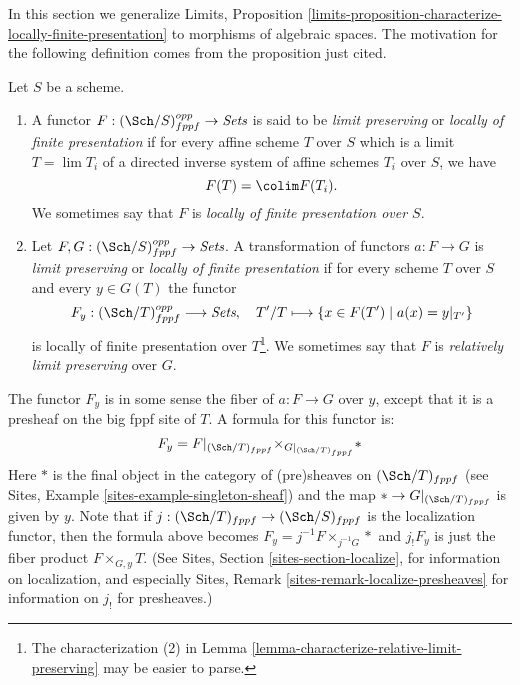 \noindent
In this section we generalize
Limits, Proposition
\ref{limits-proposition-characterize-locally-finite-presentation}
to morphisms of algebraic spaces.
The motivation for the following definition comes from
the proposition just cited.

\begin{definition}
\label{definition-locally-finite-presentation}
Let $S$ be a scheme.
\begin{enumerate}
\item A functor $F : (\Sch/S)_{fppf}^{opp} \to \textit{Sets}$
is said to be {\it limit preserving} or {\it locally of finite presentation} if
for every affine scheme $T$ over $S$ which is a limit $T = \lim T_i$
of a directed inverse system of affine schemes $T_i$ over $S$, we have
$$
F(T) = \colim F(T_i).
$$
We sometimes say that $F$ is {\it locally of finite presentation over $S$}.
\item Let $F, G : (\Sch/S)_{fppf}^{opp} \to \textit{Sets}$.
A transformation of functors $a : F \to G$
is {\it limit preserving} or {\it locally of finite presentation}
if for every scheme $T$ over $S$ and every $y \in G(T)$ the functor
$$
F_y : (\Sch/T)_{fppf}^{opp} \longrightarrow \textit{Sets}, \quad
T'/T \longmapsto \{x \in F(T') \mid a(x) = y|_{T'}\}
$$
is locally of finite presentation over $T$\footnote{The characterization (2) in
Lemma \ref{lemma-characterize-relative-limit-preserving}
may be easier to parse.}. We sometimes say that
$F$ is {\it relatively limit preserving} over $G$.
\end{enumerate}
\end{definition}

\noindent
The functor $F_y$ is in some sense the fiber of
$a : F \to G$ over $y$, except that it is a presheaf on the big fppf
site of $T$. A formula for this functor is:
\begin{equation}
\label{equation-fibre-map-functors}
F_y =
F|_{(\Sch/T)_{fppf}}
{\times}_{G|_{(\Sch/T)_{fppf}}}
*
\end{equation}
Here $*$ is the final object in the category of (pre)sheaves
on $(\Sch/T)_{fppf}$ (see
Sites, Example \ref{sites-example-singleton-sheaf})
and the map $* \to G|_{(\Sch/T)_{fppf}}$ is given by $y$.
Note that if $j : (\Sch/T)_{fppf} \to (\Sch/S)_{fppf}$
is the localization functor, then the formula above becomes
$F_y = j^{-1}F \times_{j^{-1}G} *$ and $j_!F_y$ is just the fiber product
$F \times_{G, y} T$. (See
Sites, Section \ref{sites-section-localize},
for information on localization, and especially
Sites, Remark \ref{sites-remark-localize-presheaves}
for information on $j_!$ for presheaves.)

